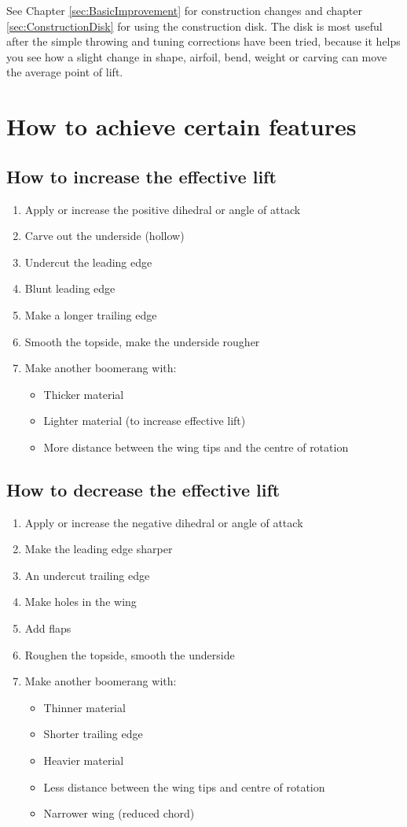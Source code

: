 See Chapter \ref{sec:BasicImprovement} for construction changes and chapter \ref{sec:ConstructionDisk} for using the construction disk. The disk is most useful after the simple throwing and tuning corrections have been tried, because it helps you see how a slight change in shape, airfoil, bend, weight or carving can move the average point of lift.
	
\section{How to achieve certain features}
\label{sec:AchieveCorrect}
\subsection{How to increase the effective lift}
\label{sec:increaseLift}
\begin{enumerate}
	\item Apply or increase the positive dihedral or angle of attack
	\item Carve out the underside (hollow)
	\item Undercut the leading edge
	\item Blunt leading edge 
	\item Make a longer trailing edge 
	\item Smooth the topside, make the underside rougher
	\item Make another boomerang with:
	\begin{itemize}
		\item Thicker material 
		\item Lighter material (to increase effective lift)
		\item More  distance  between the wing tips and the centre of rotation
	\end{itemize}
\end{enumerate}

\subsection{How to decrease the effective lift}
\label{sec:decreaseLift}
\begin{enumerate}
\item Apply or increase the negative dihedral or angle of attack 
\item Make the leading edge sharper
\item An undercut trailing edge
\item Make holes in the wing
\item Add flaps
\item Roughen the topside, smooth the underside
\item Make another boomerang with:
	\begin{itemize}
	\item Thinner material
	\item Shorter trailing edge 
	\item Heavier material
	\item Less distance between the wing tips and centre of rotation
	\item Narrower wing (reduced chord)
	\end{itemize}
\end{enumerate}

